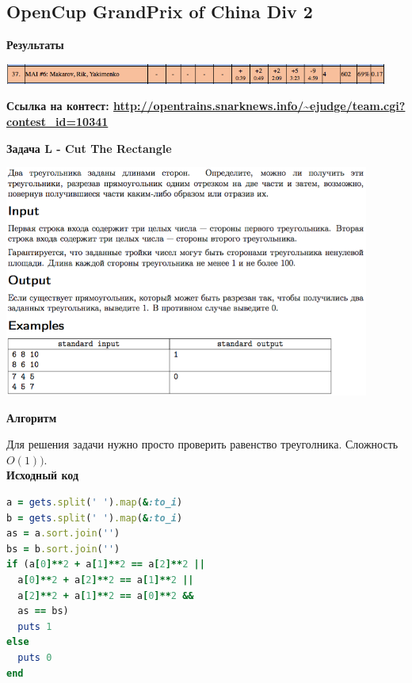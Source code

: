 \documentclass[a4paper,12pt]{article}
\begin{document}
\subsection{OpenCup GrandPrix of China Div 2}

\textbf{{\large Результаты}} \\
\begin{center}
\includegraphics[width=0.95\textwidth]{OC_China_2016/result.png}\\ [1cm]
\end{center}

\textbf{{\large Ссылка на контест: \url{http://opentrains.snarknews.info/~ejudge/team.cgi?contest_id=10341}}}

\newpage
\textbf{{\large Задача L - Cut The Rectangle}}

\begin{center}
\includegraphics[width=0.9\textwidth]{OC_China_2016/L.png}\\ [1cm]
\end{center}

\textbf{{\large Алгоритм}}

Для решения задачи нужно просто проверить равенство треуголника. Сложность $O(1))$. \\

\textbf{{\large Исходный код}} \\
\begin{lstlisting}[language=Ruby]
a = gets.split(' ').map(&:to_i)
b = gets.split(' ').map(&:to_i)
as = a.sort.join('')
bs = b.sort.join('')
if (a[0]**2 + a[1]**2 == a[2]**2 ||
  a[0]**2 + a[2]**2 == a[1]**2 ||
  a[2]**2 + a[1]**2 == a[0]**2 &&
  as == bs)
  puts 1
else
  puts 0
end
\end{lstlisting}
\end{document}
